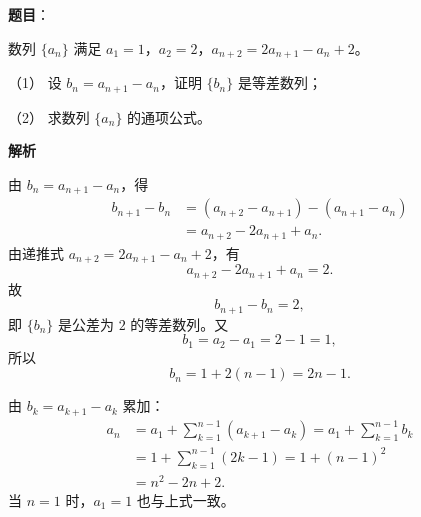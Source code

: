 \begin{answer}

\textbf{题目}：

数列 $\{a_n\}$ 满足 $a_1=1$，$a_2=2$，$a_{n+2}=2a_{n+1}-a_n+2$。

（1） 设 $b_n=a_{n+1}-a_n$，证明 $\{b_n\}$ 是等差数列；

（2） 求数列 $\{a_n\}$ 的通项公式。

\textbf{解析}


由 $b_n=a_{n+1}-a_n$，得
\nopagebreak[4]
\[\begin{aligned}
b_{n+1}-b_n
&=(a_{n+2}-a_{n+1})-(a_{n+1}-a_n)\\
&=a_{n+2}-2a_{n+1}+a_n.
\end{aligned}\]
由递推式 $a_{n+2}=2a_{n+1}-a_n+2$，有
\nopagebreak[4]
\[a_{n+2}-2a_{n+1}+a_n=2.\]
故
\nopagebreak[4]
\[b_{n+1}-b_n=2,\]
即 $\{b_n\}$ 是公差为 $2$ 的等差数列。又
\nopagebreak[4]
\[b_1=a_2-a_1=2-1=1,\]
所以
\nopagebreak[4]
\[b_n=1+2(n-1)=2n-1.\]


由 $b_k=a_{k+1}-a_k$ 累加：
\nopagebreak[4]
\[\begin{aligned}
a_n&=a_1+\sum_{k=1}^{n-1}(a_{k+1}-a_k)
=a_1+\sum_{k=1}^{n-1}b_k\\
&=1+\sum_{k=1}^{n-1}(2k-1)
=1+(n-1)^2\\
&=n^2-2n+2.
\end{aligned}\]
当 $n=1$ 时，$a_1=1$ 也与上式一致。



\end{answer}
